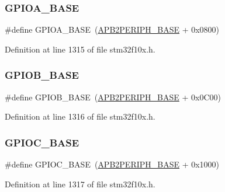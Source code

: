 \subsubsection{\texorpdfstring{G\+P\+I\+O\+A\+\_\+\+B\+A\+SE}{GPIOA\_BASE}}
{\footnotesize\ttfamily \#define G\+P\+I\+O\+A\+\_\+\+B\+A\+SE~(\hyperlink{group___peripheral__memory__map_ga25b99d6065f1c8f751e78f43ade652cb}{A\+P\+B2\+P\+E\+R\+I\+P\+H\+\_\+\+B\+A\+SE} + 0x0800)}



Definition at line 1315 of file stm32f10x.\+h.

\mbox{\label{group___peripheral__memory__map_gac944a89eb789000ece920c0f89cb6a68}} 
\subsubsection{\texorpdfstring{G\+P\+I\+O\+B\+\_\+\+B\+A\+SE}{GPIOB\_BASE}}
{\footnotesize\ttfamily \#define G\+P\+I\+O\+B\+\_\+\+B\+A\+SE~(\hyperlink{group___peripheral__memory__map_ga25b99d6065f1c8f751e78f43ade652cb}{A\+P\+B2\+P\+E\+R\+I\+P\+H\+\_\+\+B\+A\+SE} + 0x0\+C00)}



Definition at line 1316 of file stm32f10x.\+h.

\mbox{\label{group___peripheral__memory__map_ga26f267dc35338eef219544c51f1e6b3f}} 
\subsubsection{\texorpdfstring{G\+P\+I\+O\+C\+\_\+\+B\+A\+SE}{GPIOC\_BASE}}
{\footnotesize\ttfamily \#define G\+P\+I\+O\+C\+\_\+\+B\+A\+SE~(\hyperlink{group___peripheral__memory__map_ga25b99d6065f1c8f751e78f43ade652cb}{A\+P\+B2\+P\+E\+R\+I\+P\+H\+\_\+\+B\+A\+SE} + 0x1000)}



Definition at line 1317 of file stm32f10x.\+h.

